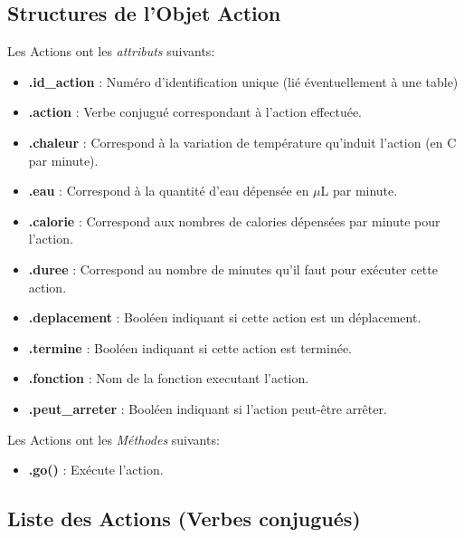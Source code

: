 \documentclass[french]{report}
\begin{document}
\subsection{Structures de l'Objet Action}
Les Actions ont les \textit{attributs} suivants:
\begin{itemize}
	\item \textbf{.id\_action} : Numéro d'identification unique (lié éventuellement à une table)
	\item \textbf{.action} : Verbe conjugué correspondant à l'action effectuée.
	\item \textbf{.chaleur} : Correspond à la variation de température qu'induit l'action  (en \degres C par minute).
	\item \textbf{.eau}  : Correspond à la quantité d'eau dépensée en $\mu$L par minute.
	\item \textbf{.calorie} : Correspond aux nombres de calories dépensées par minute pour l'action.
	\item \textbf{.duree} : Correspond au nombre de minutes qu'il faut pour exécuter cette action.
	\item \textbf{.deplacement} : Booléen indiquant si cette action est un déplacement.
	\item \textbf{.termine} : Booléen indiquant si cette action est terminée.
	\item \textbf{.fonction} : Nom de la fonction executant l'action.
	\item \textbf{.peut\_arreter} : Booléen indiquant si l'action peut-être arrêter.\\
\end{itemize}
Les Actions ont les \textit{Méthodes} suivants:
\begin{itemize}
	\item \textbf{.go()} : Exécute l'action.
\end{itemize}
\subsection{Liste des Actions (Verbes conjugués)}
\end{document}
